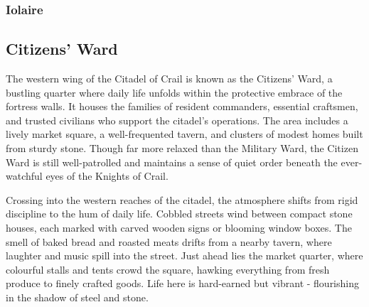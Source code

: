 \subsubsection*{ Iolaire}
\subsection*{ Citizens' Ward}
{\entryfont The western wing of the Citadel of Crail is known as the Citizens' Ward, a bustling quarter where daily life unfolds within the protective embrace of the fortress walls. It houses the families of resident commanders, essential craftsmen, and trusted civilians who support the citadel's operations. The area includes a lively market square, a well-frequented tavern, and clusters of modest homes built from sturdy stone. Though far more relaxed than the Military Ward, the Citizen Ward is still well-patrolled and maintains a sense of quiet order beneath the ever-watchful eyes of the Knights of Crail.}
\begin{DndReadAloud}
	Crossing into the western reaches of the citadel, the atmosphere shifts from rigid discipline to the hum of daily life. Cobbled streets wind between compact stone houses, each marked with carved wooden signs or blooming window boxes. The smell of baked bread and roasted meats drifts from a nearby tavern, where laughter and music spill into the street. Just ahead lies the market quarter, where colourful stalls and tents crowd the square, hawking everything from fresh produce to finely crafted goods. Life here is hard-earned but vibrant - flourishing in the shadow of steel and stone.
\end{DndReadAloud}
